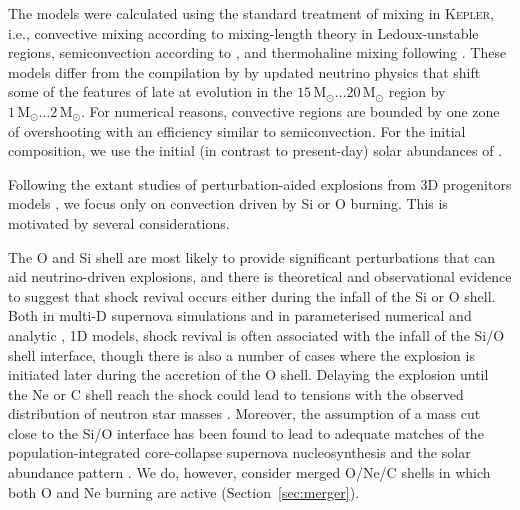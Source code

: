 \documentclass[useAMS,usenatbib]{mnras}
\newcommand{\Msun}{\ensuremath{\mathrm{M}_\odot}}
\begin{document}
The models were calculated using the standard treatment of mixing in
\textsc{Kepler}, i.e., convective mixing according to mixing-length
theory in Ledoux-unstable regions, semiconvection according to
\citet{weaver_78}, and thermohaline mixing following \citet{heger_05}.
These models differ from the compilation by
\citet{sukhbold_14,sukhbold_16} by updated neutrino physics that shift
some of the features of late at evolution in the $15\,\Msun \ldots
20\,\Msun$ region by $1\,\Msun \ldots 2\,\Msun$.  For numerical reasons,
convective regions are bounded by one zone of overshooting with an
efficiency similar to semiconvection.  For the initial composition, we
use the initial (in contrast to present-day) solar abundances of
\citet{asplund_09}.

Following the extant studies of perturbation-aided explosions from 3D
progenitors models \citep{couch_15,mueller_16b,mueller_17}, we focus
only on convection driven by Si or O burning. This is motivated
by several considerations.

The O and Si shell
are most likely to provide significant perturbations that can aid
neutrino-driven explosions, and there is theoretical and observational
evidence to suggest that shock revival occurs either during the infall
of the Si or O shell. Both in multi-D supernova simulations
\citep{suwa_14,summa_16} and in parameterised numerical
\citep{ugliano_12,ertl_15} and analytic \citep{mueller_16a},
1D models, shock revival is often associated with the
infall of the Si/O shell interface, though there is also a number of
cases where the explosion is initiated later during the accretion of
the O shell.  Delaying the explosion until the Ne or C shell reach the
shock could lead to tensions with the observed distribution of neutron
star masses \citep{schwab_10,oezel_12,oezel_16}.
Moreover, the
assumption of a mass cut close to the Si/O interface has been found to
lead to adequate matches of the population-integrated core-collapse
supernova nucleosynthesis and the solar abundance pattern
\citep{woosley_02}. We do, however, consider merged O/Ne/C shells in
which both O and Ne burning are active (Section~\ref{sec:merger}).
\end{document}
